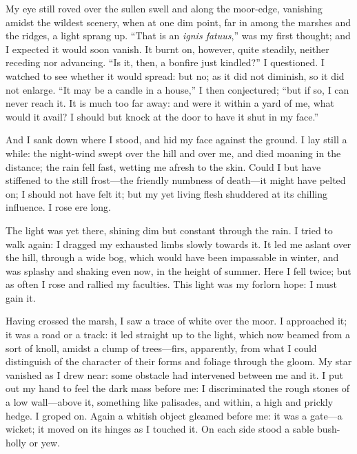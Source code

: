 My eye still roved over the sullen swell and along the moor-edge,
vanishing amidst the wildest scenery, when at one dim point, far in
among the marshes and the ridges, a light sprang up. \enquote{That is an
	\emph{ignis fatuus},} was my first thought; and I expected it would
soon vanish. It burnt on, however, quite steadily, neither receding nor
advancing. \enquote{Is it, then, a bonfire just kindled?} I
questioned. I watched to see whether it would spread: but no; as it did
not diminish, so it did not enlarge. \enquote{It may be a candle in a
	house,} I then conjectured; \enquote{but if so, I can never reach it.
	It is much too far away: and were it within a yard of me, what would it
	avail? I should but knock at the door to have it shut in my face.}

And I sank down where I stood, and hid my face against the ground. I
lay still a while: the night-wind swept over the hill and over me, and
died moaning in the distance; the rain fell fast, wetting me afresh to
the skin. Could I but have stiffened to the still frost---the friendly
numbness of death---it might have pelted on; I should not have felt it;
but my yet living flesh shuddered at its chilling influence. I rose ere
long.

The light was yet there, shining dim but constant through the rain. I
tried to walk again: I dragged my exhausted limbs slowly towards it. It
led me aslant over the hill, through a wide bog, which would have been
impassable in winter, and was splashy and shaking even now, in the
height of summer. Here I fell twice; but as often I rose and rallied my
faculties. This light was my forlorn hope: I must gain it.

Having crossed the marsh, I saw a trace of white over the moor. I
approached it; it was a road or a track: it led straight up to the
light, which now beamed from a sort of knoll, amidst a clump of
trees---firs, apparently, from what I could distinguish of the character
of their forms and foliage through the gloom. My star vanished as I
drew near: some obstacle had intervened between me and it. I put out my
hand to feel the dark mass before me: I discriminated the rough stones
of a low wall---above it, something like palisades, and within, a high
and prickly hedge. I groped on. Again a whitish object gleamed before
me: it was a gate---a wicket; it moved on its hinges as I touched it.
On each side stood a sable bush-holly or yew.

